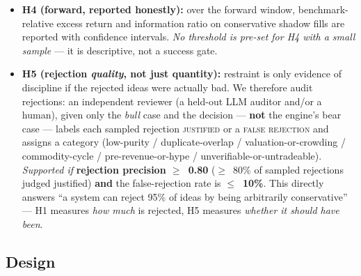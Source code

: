 \documentclass[11pt]{article}
\begin{document}
\begin{itemize}
  \item \textbf{H4 (forward, reported honestly):} over the forward window, benchmark-relative
    excess return and information ratio on conservative shadow fills are reported with confidence
    intervals. \emph{No threshold is pre-set for H4 with a small sample} --- it is descriptive,
    not a success gate.

  \item \textbf{H5 (rejection \emph{quality}, not just quantity):} restraint is only evidence of
    discipline if the rejected ideas were actually bad. We therefore audit rejections: an
    independent reviewer (a held-out LLM auditor and/or a human), given only the \emph{bull} case
    and the decision --- \textbf{not} the engine's bear case --- labels each sampled rejection
    \textsc{justified} or a \textsc{false rejection} and assigns a category (low-purity /
    duplicate-overlap / valuation-or-crowding / commodity-cycle / pre-revenue-or-hype /
    unverifiable-or-untradeable). \emph{Supported if} \textbf{rejection precision $\geq$~0.80}
    ($\geq$~80\% of sampled rejections judged justified) \textbf{and} the false-rejection rate is
    \textbf{$\leq$~10\%}. This directly answers ``a system can reject 95\% of ideas by being
    arbitrarily conservative'' --- H1 measures \emph{how much} is rejected, H5 measures
    \emph{whether it should have been}.
\end{itemize}

\subsection*{Design}
\end{document}
